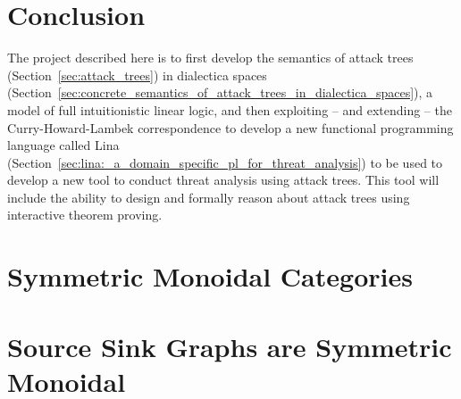 \documentclass{llncs}
\begin{document}
\section{Conclusion}
\label{sec:conclusion}
The project described here is to first develop the semantics of attack
trees (Section~\ref{sec:attack_trees}) in dialectica spaces
(Section~\ref{sec:concrete_semantics_of_attack_trees_in_dialectica_spaces}),
a model of full intuitionistic linear logic, and then exploiting --
and extending -- the Curry-Howard-Lambek correspondence to develop a
new functional programming language called Lina
(Section~\ref{sec:lina:_a_domain_specific_pl_for_threat_analysis}) to
be used to develop a new tool to conduct threat analysis using attack
trees.  This tool will include the ability to design and formally
reason about attack trees using interactive theorem proving.


 

\appendix

\section{Symmetric Monoidal Categories}
\label{sec:symmetric_monoidal_categories}


\section{Source Sink Graphs are Symmetric Monoidal}
\label{sec:source_sink_graphs_are_symmetric_monoidal}

\end{document}
